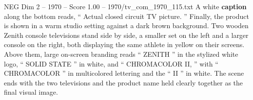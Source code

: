 \begin{textsample}{NEG Dim 2 – 1970 – Score 1.00 – 1970/tv\_com\_1970\_115.txt}
A white \textbf{caption} along the bottom reads, “ Actual closed circuit TV picture. ” Finally, the product is shown in a warm studio setting against a dark brown background.
Two wooden Zenith console televisions stand side by side, a smaller set on the left and a larger console on the right, both displaying the same athlete in yellow on their screens.
Above them, large on-screen branding reads “ ZENITH ” in the stylized white logo, “ SOLID STATE ” in white, and “ CHROMACOLOR II, ” with “ CHROMACOLOR ” in multicolored lettering and the “ II ” in white.
The scene ends with the two televisions and the product name held clearly together as the final visual image.

\end{textsample}
